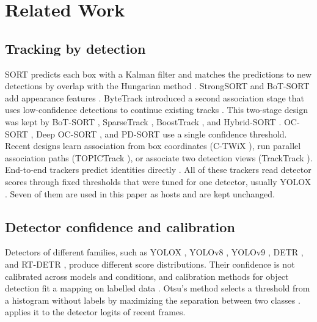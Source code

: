 \section{Related Work}\label{sec:related}

\subsection{Tracking by detection}
SORT predicts each box with a Kalman filter and matches the predictions to new
detections by overlap with the Hungarian method \cite{bewley2016sort}.
StrongSORT and BoT-SORT add appearance features
\cite{du2023strongsort,aharon2022botsort}. ByteTrack
introduced a second association stage that uses low-confidence detections to
continue existing tracks \cite{zhang2022bytetrack}. This two-stage design was
kept by BoT-SORT \cite{aharon2022botsort}, SparseTrack \cite{liu2025sparsetrack},
BoostTrack \cite{stanojevic2024boosttrack}, and Hybrid-SORT
\cite{yang2024hybridsort}. OC-SORT \cite{cao2023ocsort}, Deep OC-SORT
\cite{maggiolino2023deepocsort}, and PD-SORT \cite{wang2025pdsort} use a single
confidence threshold. Recent designs learn association from box coordinates
(C-TWiX \cite{miah2025twix}), run parallel association paths (TOPICTrack
\cite{cao2025topictrack}), or associate two detection views (TrackTrack
\cite{shim2025tracktrack}). End-to-end trackers predict identities directly
\cite{zeng2022motr,gao2025motip}. All of these trackers read detector scores
through fixed thresholds that were tuned for one detector, usually YOLOX
\cite{ge2021yolox}. Seven of them are used in this paper as hosts and are kept
unchanged.

\subsection{Detector confidence and calibration}
Detectors of different families, such as YOLOX \cite{ge2021yolox}, YOLOv8
\cite{jocher2023yolov8}, YOLOv9 \cite{wang2024yolov9}, DETR
\cite{carion2020detr}, and RT-DETR
\cite{zhao2024rtdetr}, produce different score distributions. Their confidence
is not calibrated across models and conditions, and calibration methods for
object detection fit a mapping on labelled data \cite{kuppers2020detcalib}.
Otsu's method selects a threshold from a histogram without labels by
maximizing the separation between two classes \cite{otsu1979}. \scl{}
applies it to the detector logits of recent frames.

